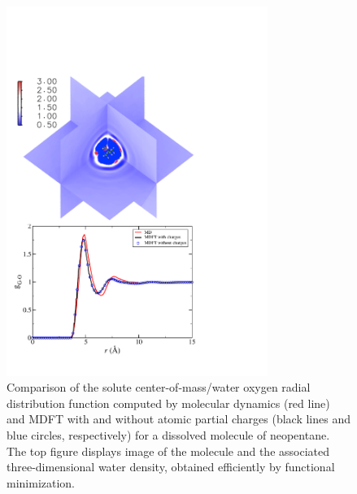 \documentclass[aip,jcp,showpacs,amsmath,amssymb,superscriptaddress]{revtex4-1}
\begin{document}
\begin{figure}
    \includegraphics[width=8.5cm]{neopentane_g_and_dens.pdf}
    \caption{
        \label{fig:gr_neopentane}
        Comparison of the solute center-of-mass/water oxygen radial distribution function computed by molecular dynamics (red line) and MDFT
        with and without atomic partial charges (black lines and blue circles, respectively) for a dissolved molecule of neopentane. The top figure displays image of the molecule and the associated three-dimensional water density, obtained efficiently by functional minimization.
        }
\end{figure}
\end{document}
